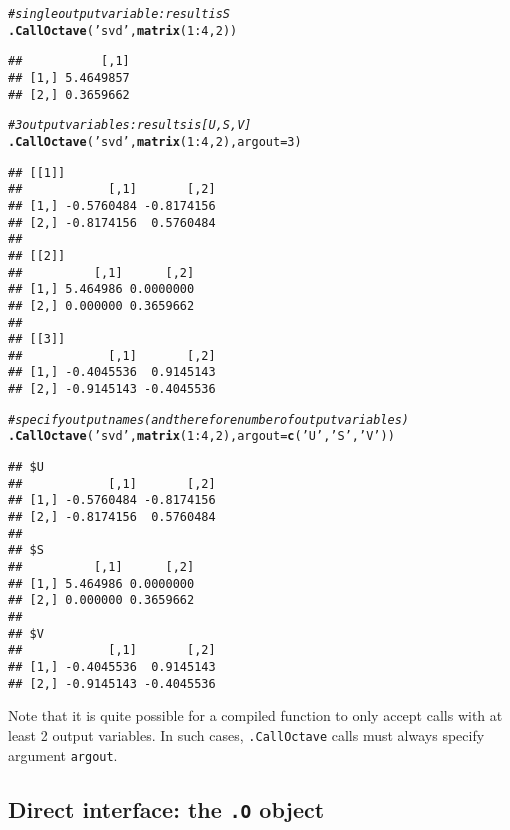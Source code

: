 \documentclass[english,10pt,a4paper]{article}\usepackage[]{graphicx}\usepackage[]{color}
\makeatletter
\newcommand{\hlnum}[1]{\textcolor[rgb]{0.686,0.059,0.569}{#1}}%
\newcommand{\hlstr}[1]{\textcolor[rgb]{0.192,0.494,0.8}{#1}}%
\newcommand{\hlcom}[1]{\textcolor[rgb]{0.678,0.584,0.686}{\textit{#1}}}%
\newcommand{\hlopt}[1]{\textcolor[rgb]{0,0,0}{#1}}%
\newcommand{\hlstd}[1]{\textcolor[rgb]{0.345,0.345,0.345}{#1}}%
\newcommand{\hlkwc}[1]{\textcolor[rgb]{0.333,0.667,0.333}{#1}}%
\newcommand{\hlkwd}[1]{\textcolor[rgb]{0.737,0.353,0.396}{\textbf{#1}}}%
\newenvironment{kframe}{%
 \def\at@end@of@kframe{}%
 \ifinner\ifhmode%
  \def\at@end@of@kframe{\end{minipage}}%
  \begin{minipage}{\columnwidth}%
 \fi\fi%
 \def\FrameCommand##1{\hskip\@totalleftmargin \hskip-\fboxsep
 \colorbox{shadecolor}{##1}\hskip-\fboxsep
     \hskip-\linewidth \hskip-\@totalleftmargin \hskip\columnwidth}%
 \MakeFramed {\advance\hsize-\width
   \@totalleftmargin\z@ \linewidth\hsize
   \@setminipage}}%
 {\par\unskip\endMakeFramed%
 \at@end@of@kframe}
\newenvironment{knitrout}{}{} %
\let\code=\texttt
\makeatother
\begin{document}
\begin{knitrout}
\color{fgcolor}\begin{kframe}
\begin{alltt}
\hlcom{# single output variable: result is S}
\hlkwd{.CallOctave}\hlstd{(}\hlstr{'svd'}\hlstd{,} \hlkwd{matrix}\hlstd{(}\hlnum{1}\hlopt{:}\hlnum{4}\hlstd{,} \hlnum{2}\hlstd{))}
\end{alltt}
\begin{verbatim}
##           [,1]
## [1,] 5.4649857
## [2,] 0.3659662
\end{verbatim}
\begin{alltt}
\hlcom{# 3 output variables: results is [U,S,V]}
\hlkwd{.CallOctave}\hlstd{(}\hlstr{'svd'}\hlstd{,} \hlkwd{matrix}\hlstd{(}\hlnum{1}\hlopt{:}\hlnum{4}\hlstd{,} \hlnum{2}\hlstd{),} \hlkwc{argout}\hlstd{=}\hlnum{3}\hlstd{)}
\end{alltt}
\begin{verbatim}
## [[1]]
##            [,1]       [,2]
## [1,] -0.5760484 -0.8174156
## [2,] -0.8174156  0.5760484
## 
## [[2]]
##          [,1]      [,2]
## [1,] 5.464986 0.0000000
## [2,] 0.000000 0.3659662
## 
## [[3]]
##            [,1]       [,2]
## [1,] -0.4045536  0.9145143
## [2,] -0.9145143 -0.4045536
\end{verbatim}
\begin{alltt}
\hlcom{# specify output names (and therefore number of output variables)}
\hlkwd{.CallOctave}\hlstd{(}\hlstr{'svd'}\hlstd{,} \hlkwd{matrix}\hlstd{(}\hlnum{1}\hlopt{:}\hlnum{4}\hlstd{,} \hlnum{2}\hlstd{),} \hlkwc{argout}\hlstd{=}\hlkwd{c}\hlstd{(}\hlstr{'U'}\hlstd{,} \hlstr{'S'}\hlstd{,} \hlstr{'V'}\hlstd{))}
\end{alltt}
\begin{verbatim}
## $U
##            [,1]       [,2]
## [1,] -0.5760484 -0.8174156
## [2,] -0.8174156  0.5760484
## 
## $S
##          [,1]      [,2]
## [1,] 5.464986 0.0000000
## [2,] 0.000000 0.3659662
## 
## $V
##            [,1]       [,2]
## [1,] -0.4045536  0.9145143
## [2,] -0.9145143 -0.4045536
\end{verbatim}
\end{kframe}
\end{knitrout}

Note that it is quite possible for a compiled function to only accept
calls with at least 2 output variables.
In such cases, \code{.CallOctave} calls must always specify argument
\code{argout}.

\subsection{Direct interface: the \texttt{.O} object}
\end{document}
